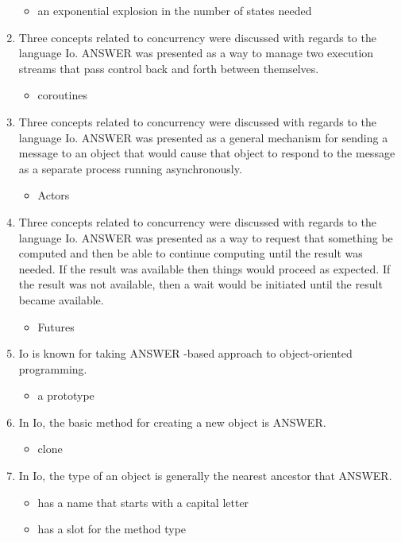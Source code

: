 \documentclass{exam}
\begin{document}
\begin{enumerate}
\begin{itemize}
\item an exponential explosion in the number of states needed
\end{itemize}
\item Three concepts related to concurrency were discussed with regards to the language Io.  ANSWER was presented as a way to manage two execution streams that pass control back and forth between themselves.
\begin{itemize}
\item coroutines
\end{itemize}
\item Three concepts related to concurrency were discussed with regards to the language Io.  ANSWER was presented as a general mechanism for sending a message to an object that would cause that object to respond to the message as a separate process running asynchronously.
\begin{itemize}
\item Actors
\end{itemize}
\item Three concepts related to concurrency were discussed with regards to the language Io.  ANSWER was presented as a way to request that something be computed and then be able to continue computing until the result was needed.  If the result was available then things would proceed as expected.  If the result was not available, then a wait would be initiated until the result became available.
\begin{itemize}
\item Futures
\end{itemize}
\item Io is known for taking ANSWER -based approach to object-oriented programming.
\begin{itemize}
\item a prototype
\end{itemize}
\item In Io, the basic method for creating a new object is ANSWER.
\begin{itemize}
\item clone
\end{itemize}
\item In Io, the type of an object is generally the nearest ancestor that ANSWER.
\begin{itemize}
\item has a name that starts with a capital letter
\item has a slot for the method type

\end{itemize}
\end{enumerate}
\end{document}
